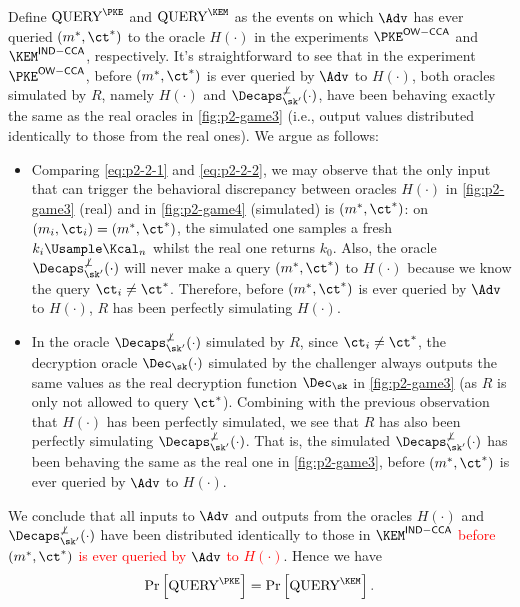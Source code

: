 \begin{answer}[ii]
    Define $\textrm{QUERY}^\PKE$ and $\textrm{QUERY}^\KEM$  as the events on which $\Adv$ has ever queried $(m^\ast, \ct^\ast)$ to the oracle $H(\cdot)$ in the experiments $\PKE^{\mathsf{OW-CCA}}$ and $\KEM^{\mathsf{IND-CCA}}$, respectively.
    It's straightforward to see that in the experiment $\PKE^{\mathsf{OW-CCA}}$, before $(m^\ast, \ct^\ast)$ is ever queried by $\Adv$ to $H(\cdot)$, both oracles simulated by $R$, namely $H(\cdot)$ and  $\Decaps^{\not\bot}_{\sk'}(\cdot)$, have been behaving exactly the same as the real oracles in \autoref{fig:p2-game3} (i.e., output values distributed identically to those from the real ones). We argue as follows:
    \begin{itemize}
        \item Comparing \eqref{eq:p2-2-1} and \eqref{eq:p2-2-2}, we may observe that the only input that can trigger the behavioral discrepancy between oracles $H(\cdot)$ in \autoref{fig:p2-game3} (real) and in \autoref{fig:p2-game4} (simulated) is $(m^\ast, \ct^\ast)$: on $(m_i,\ct_i)=(m^\ast, \ct^\ast)$, the simulated one samples a fresh $k_i\Usample\Kcal_n$ whilst the real one returns $k_0$. Also, the oracle $\Decaps^{\not\bot}_{\sk'}(\cdot)$ will never make a query $(m^\ast, \ct^\ast)$ to $H(\cdot)$ because we know the query $\ct_i\neq \ct^\ast$.         
        Therefore, before $(m^\ast, \ct^\ast)$ is ever queried by $\Adv$ to $H(\cdot)$, $R$ has been perfectly simulating $H(\cdot)$.
        
        \item In the oracle $\Decaps^{\not\bot}_{\sk'}(\cdot)$ simulated by $R$, since $\ct_i\neq \ct^\ast$, the decryption oracle $\Dec_\sk(\cdot)$ simulated by the challenger always outputs the same values as the real decryption function $\Dec_\sk$ in \autoref{fig:p2-game3} (as $R$ is only not allowed to query $\ct^\ast$). Combining with the previous observation that $H(\cdot)$ has been perfectly simulated, we see that $R$ has also been perfectly simulating $\Decaps^{\not\bot}_{\sk'}(\cdot)$. That is, the simulated $\Decaps^{\not\bot}_{\sk'}(\cdot)$ has been behaving the same as the real one in \autoref{fig:p2-game3}, before $(m^\ast, \ct^\ast)$ is ever queried by $\Adv$ to $H(\cdot)$.
    \end{itemize}
    We conclude that all inputs to $\Adv$ and outputs from the oracles $H(\cdot)$ and  $\Decaps^{\not\bot}_{\sk'}(\cdot)$ have been distributed identically to those in  $\KEM^{\mathsf{IND-CCA}}$ \textcolor{red}{before $(m^\ast, \ct^\ast)$ is ever queried by $\Adv$ to $H(\cdot)$}. Hence we have
    \begin{equation}\label{eq:p2-2-7}
        \Pr\left[\textrm{QUERY}^\PKE \right]= \Pr\left[\textrm{QUERY}^\KEM\right].
    \end{equation}


\end{answer}
